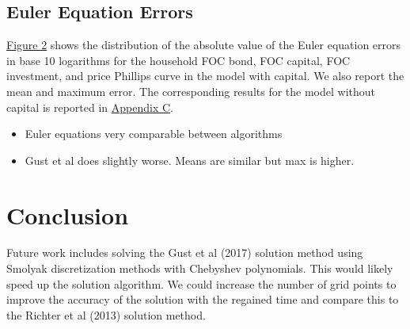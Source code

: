\documentclass[12pt, final]{article}
\begin{document}
\subsection{Euler Equation Errors} \hyperlink{Figure 2}{Figure 2} shows the distribution of the absolute value of the Euler equation errors in base 10 logarithms for the household FOC bond, FOC capital, FOC investment, and price Phillips curve in the model with capital. We also report the mean and maximum error. The corresponding results for the model without capital is reported in \hyperlink{Appendix C}{Appendix C}.

\begin{itemize}
\item Euler equations very comparable between algorithms
\item Gust et al does slightly worse. Means are similar but max is higher.
  \end{itemize}

\section{Conclusion}
Future work includes solving the Gust et al (2017) solution method using Smolyak discretization methods with Chebyshev polynomials. This would likely speed up the solution algorithm. We could increase the number of grid points to improve the accuracy of the solution with the regained time and compare this to the Richter et al (2013) solution method.

\appendix
\end{document}
